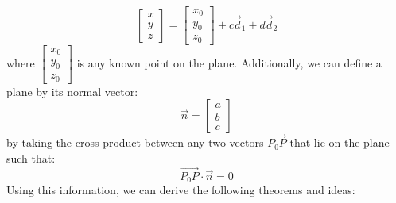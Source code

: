 \documentclass{article}
\begin{document}
\begin{equation}
    \begin{bmatrix}
        x\\y\\z
    \end{bmatrix}=\begin{bmatrix}
        x_0\\y_0\\z_0
    \end{bmatrix}+c\vec{d}_1+d\vec{d}_2
    \label{eq:}
\end{equation}
where $\begin{bmatrix}
    x_0\\y_0\\z_0
\end{bmatrix}$ is any known point on the plane. Additionally, we can define a plane by its normal vector:
\begin{equation}
    \vec{n}=\begin{bmatrix}
        a\\b\\c
    \end{bmatrix}
    \label{eq:}
\end{equation}
by taking the cross product between any two vectors $\overrightarrow{P_0P}$ that lie on the plane such that:
\begin{equation}
    \overrightarrow{P_0P} \cdot \vec{n} = 0
    \label{eq:}
\end{equation}
Using this information, we can derive the following theorems and ideas:
\end{document}
